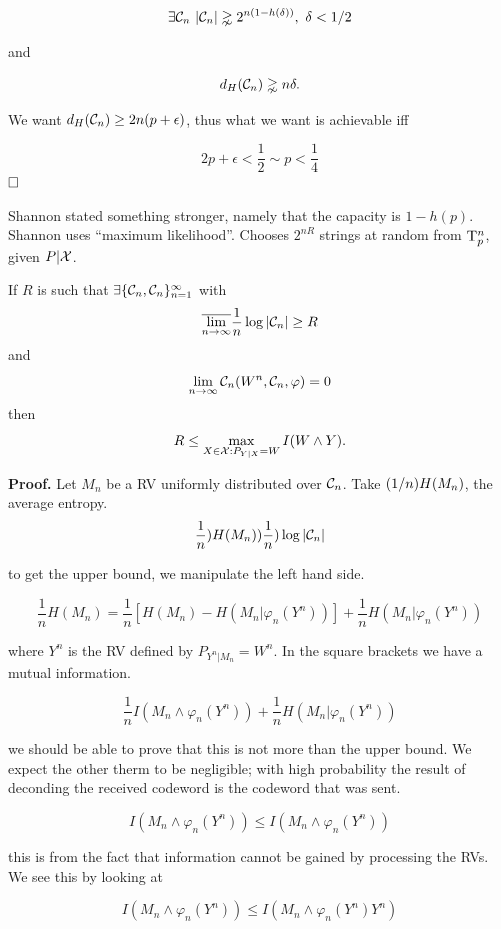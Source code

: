 \[
\exists \mathcal{C}_n\ |\mathcal{C}_n | \gnsim 2^{n(1-h(\delta))},\ \delta < {1}/{2}
\]

and

\[
d_H(\mathcal{C}_n) \gnsim n\delta.
\]

We want $d_H(\mathcal{C}_n) \geq 2n(p+\epsilon)$, thus what we want is achievable iff

\[
2p + \epsilon < \dfrac{1}{2} \sim p < \dfrac{1}{4}
\]
$\hfill\Box$

Shannon stated something stronger, namely that the capacity is $1 - h(p)$. Shannon uses ``maximum likelihood''. Chooses $2^{nR}$ strings at random from $\mathrm{T}^n_p$, given $P|\mathcal{X}$.

\begin{thm}
	If $R$ is such that $\exists \{\mathcal{C}_n, \mathcal{C}_n\}_{n=1}^\infty$ with
	$$\overline{\lim_{n \rightarrow \infty}} \dfrac{1}{n} \log|\mathcal{C}_n| \geq R$$
	and
	$$\lim_{n\rightarrow \infty} \mathcal{C}_n(W^n, \mathcal{C}_n, \varphi) = 0$$
	then
	$$R \leq \max_{X \in \mathcal{X}:P_{Y|X} = W} I(W \wedge Y).$$
\end{thm}

\noindent\textbf{Proof.} Let $M_n$ be a RV uniformly distributed over $\mathcal{C}_n$. Take $({1}/{n})H(M_n)$, the average entropy.
\[
 \dfrac{1}{n})H(M_n) ) \dfrac{1}{n})\log|\mathcal{C}_n|
\]

to get the upper bound, we manipulate the left hand side.

\[
 \dfrac{1}{n}H(M_n) = \dfrac{1}{n}[H(M_n) - H(M_n | \varphi_n(Y^n))] + \dfrac{1}{n}H(M_n|\varphi_n(Y^n))
\]

where $Y^n$ is the RV defined by $P_{Y^n|M_n} = W^n$. In the square brackets we have a mutual information.

\[
 \dfrac{1}{n}I(M_n \wedge \varphi_n(Y^n)) + \dfrac{1}{n}H(M_n|\varphi_n(Y^n))
\]

we should be able to prove that this is not more than the upper bound. We expect the other therm to be negligible; with high probability the result of deconding the received codeword is the codeword that was sent.

\[
 I(M_n\wedge \varphi_n(Y^n)) \leq I(M_n \wedge \varphi_n(Y^n))
\]

this is from the fact that information cannot be gained by processing the RVs. We see this by looking at

\begin{equation}\label{eq:dis1}
 I(M_n\wedge \varphi_n(Y^n)) \leq I(M_n \wedge \varphi_n(Y^n)Y^n) 
\end{equation}

